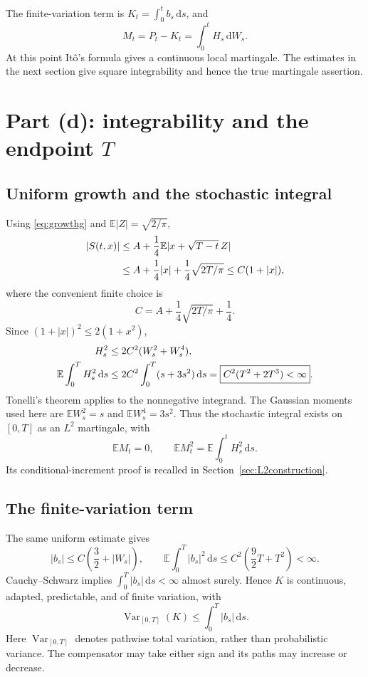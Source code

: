 \documentclass[11pt,letterpaper]{article}
\newcommand{\E}{\mathbb E}
\newcommand{\dd}{\,\mathrm d}
\DeclareMathOperator{\Var}{Var}
\begin{document}
The finite-variation term is $K_t=\int_0^t b_s\dd s$, and
\begin{equation}
M_t=P_t-K_t=\int_0^tH_s\dd W_s.
\end{equation}
At this point It\^o's formula gives a continuous local martingale. The estimates in the next section give square integrability and hence the true martingale assertion.

\section{Part (d): integrability and the endpoint \texorpdfstring{$T$}{T}}
\subsection*{Uniform growth and the stochastic integral}
Using \eqref{eq:growthg} and $\E|Z|=\sqrt{2/\pi}$,
\begin{align}
|S(t,x)|&\le A+\frac14\E|x+\sqrt{T-t}\,Z|\notag\\
&\le A+\frac14|x|+\frac14\sqrt{2T/\pi}
\le C(1+|x|),\label{eq:growthS}
\end{align}
where the convenient finite choice is
\begin{equation}\label{eq:C}
C=A+\frac14\sqrt{2T/\pi}+\frac14.
\end{equation}
Since $(1+|x|)^2\le2(1+x^2)$,
\begin{align}
H_s^2&\le2C^2(W_s^2+W_s^4),\notag\\
\E\int_0^TH_s^2\dd s
&\le2C^2\int_0^T(s+3s^2)\dd s
=\boxed{C^2(T^2+2T^3)<\infty}.\label{eq:energy}
\end{align}
Tonelli's theorem applies to the nonnegative integrand. The Gaussian moments used here are $\E W_s^2=s$ and $\E W_s^4=3s^2$. Thus the stochastic integral exists on $[0,T]$ as an $L^2$ martingale, with
\begin{equation}
\E M_t=0,\qquad \E M_t^2=\E\int_0^tH_s^2\dd s.
\end{equation}
Its conditional-increment proof is recalled in Section~\ref{sec:L2construction}.

\subsection*{The finite-variation term}
The same uniform estimate gives
\begin{equation}
|b_s|\le C\left(\frac32+|W_s|\right),\qquad
\E\int_0^T|b_s|^2\dd s\le C^2\left(\frac92T+T^2\right)<\infty.
\end{equation}
Cauchy--Schwarz implies $\int_0^T|b_s|\dd s<\infty$ almost surely. Hence $K$ is continuous, adapted, predictable, and of finite variation, with
\[
\Var_{[0,T]}(K)\le\int_0^T|b_s|\dd s.
\]
Here $\Var_{[0,T]}$ denotes pathwise total variation, rather than probabilistic variance. The compensator may take either sign and its paths may increase or decrease.
\end{document}
